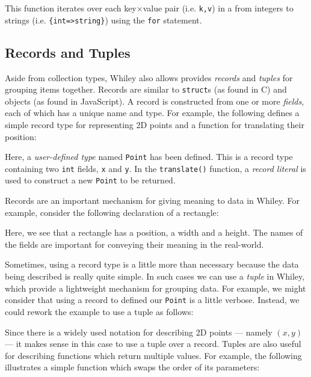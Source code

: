 

\noindent This function iterates over each key$\times$value pair (i.e. \lstinline{k,v}) in a from integers to strings (i.e. \lstinline|{int=>string}|) using the \lstinline{for} statement.

\subsection{Records and Tuples}
Aside from collection types, Whiley also allows provides {\em records} and {\em tuples} for grouping items together.  Records are similar to \lstinline{struct}s (as found in C) and objects (as found in JavaScript).  A record is constructed from one or more {\em fields}, each of which has a unique name and type.  For example, the following defines a simple record type for representing 2D points and a function for translating their position:



Here, a {\em user-defined type} named \lstinline{Point} has been defined.  This is a record type containing two \lstinline{int} fields, \lstinline{x} and \lstinline{y}.  In the \lstinline{translate()} function, a {\em record literal} is used to construct a new \lstinline{Point} to be returned.

Records are an important mechanism for giving meaning to data in Whiley.  For example, consider the following declaration of a rectangle:



Here, we see that a rectangle has a position, a width and a height.  The names of the fields are important for conveying their meaning in the real-world.

Sometimes, using a record type is a little more than necessary because the data being described is really quite simple.  In such cases we can use a {\em tuple} in Whiley, which provide a lightweight mechanism for grouping data.  For example, we might consider that using a record to defined our \lstinline{Point} is a little verbose.  Instead, we could rework the example to use a tuple as follows:



Since there is a widely used notation for describing 2D points --- namely $(x,y)$ --- it makes sense in this case to use a tuple over a record.  Tuples are also useful for describing functions which return multiple values.  For example, the following illustrates a simple function which swaps the order of its parameters:

